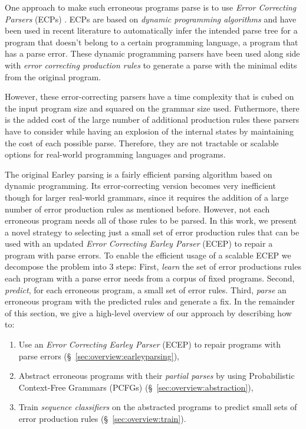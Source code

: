 One approach to make such erroneous programs parse is to use \emph{Error
Correcting Parsers} (ECPs) \citep{Aho_1972}. ECPs are based on \emph{dynamic
programming algorithms} and have been used in recent literature to automatically
infer the intended parse tree for a program that doesn't belong to a certain
programming language, \ie a program that has a parse error. These dynamic
programming parsers have been used along side with \emph{error correcting
production rules} \citep{Aho_1972} to generate a parse with the minimal edits
from the original program.

However, these error-correcting parsers have a time complexity that is cubed on
the input program size and squared on the grammar size used. Futhermore, there
is the added cost of the large number of additional production rules these
parsers have to consider while having an explosion of the internal states by
maintaining the cost of each possible parse. Therefore, they are not tractable
or scalable options for real-world programming languages and programs.


The original Earley parsing is a fairly efficient parsing algorithm
\citep{Earley_1970} based on dynamic programming. Its error-correcting version
becomes very inefficient though for larger real-world grammars, since it
requires the addition of a large number of error production rules as mentioned
before. However, not each erroneous program needs all of those rules to be
parsed. In this work, we present a novel strategy to selecting just a small set
of error production rules that can be used with an updated \emph{Error
Correcting Earley Parser} (ECEP) to repair a program with parse errors.
%
To enable the efficient usage of a scalable ECEP we decompose the problem into 3
steps:
%
First, \emph{learn} the set of error productions rules each program with a parse
error needs from a corpus of fixed programs.
%
Second, \emph{predict}, for each erroneous program, a small set of error rules.
%
Third, \emph{parse} an erroneous program with the predicted rules and generate a
fix.
%
In the remainder of this section, we give a high-level overview
of our approach by describing how to:

\begin{enumerate}

  \item Use an \emph{Error Correcting Earley Parser} (ECEP) to repair programs
  with parse errors (\S~\ref{sec:overview:earleyparsing}),

  \item Abstract erroneous programs with their \emph{partial parses} by using
  Probabilistic Context-Free Grammars (PCFGs)
  (\S~\ref{sec:overview:abstraction}),

  \item Train \emph{sequence classifiers} on the abstracted programs to predict
  small sets of error production rules (\S~\ref{sec:overview:train}).

\end{enumerate}

